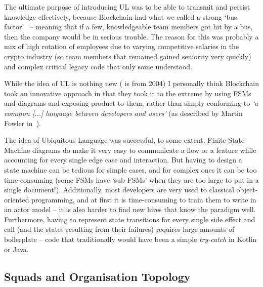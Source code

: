 \documentclass[conference]{IEEEtran}
\begin{document}
    \label{para:busFactor}
    The ultimate purpose of introducing UL was to be able to transmit and persist knowledge
    effectively, because Blockchain had what we called a strong `bus
    factor'~\cite{bowlerTruckFactor} -- meaning that if a few, knowledgeable team members got hit by
    a bus, then the company would be in serious trouble.
    The reason for this was probably a mix of high rotation of employees due to varying competitive
    salaries in the crypto industry (so team members that remained gained seniority very quickly) and
    complex critical legacy code that only some understood.

    While the idea of UL is nothing new (\cite{evansDomainDrivenDesignUL} is from 2004) I personally
    think Blockchain took an innovative approach in that they took it to the extreme by using FSMs
    and diagrams and exposing product to them, rather than simply conforming to \emph{`a common [...]
        language between developers and users'} (as described by Martin Fowler in~\cite{fowlerUL}).

    The idea of Ubiquitous Language was successful, to some extent.
    Finite State Machine diagrams do make it very easy to communicate a flow or a feature while
    accounting for every single edge case and interaction.
    But having to design a state machine can be tedious for simple cases, and
    for complex ones it can be too time-consuming (some FSMs have `sub-FSMs' when they are too large
    to put in a single document!).
    Additionally, most developers are very used to classical object-oriented programming, and at first it is time-consuming to train them
    to write in an actor model -- it is also harder to find new hires that know the
    paradigm well.
    Furthermore, having to represent state transitions for every single side effect and call (and the
    states resulting from their failures) requires large amounts of boilerplate -- code that
    traditionally would have been a simple \emph{try-catch} in Kotlin or Java.


    \subsection{Squads and Organisation Topology}\label{subsec:squads}
\end{document}

